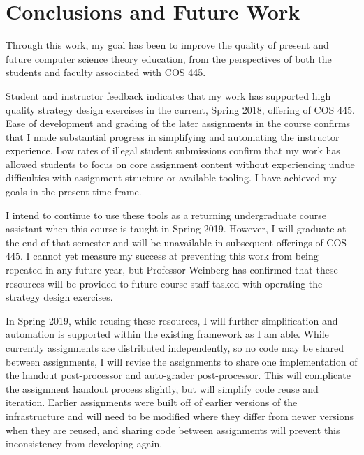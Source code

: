 \documentclass[pageno]{jpaper}
\begin{document}
\section*{Conclusions and Future Work}
Through this work, my goal has been to improve the quality of present and future computer science theory education, from the perspectives of both the students and faculty associated with COS 445.

Student and instructor feedback indicates that my work has supported high quality strategy design exercises in the current, Spring 2018, offering of COS 445.
Ease of development and grading of the later assignments in the course confirms that I made substantial progress in simplifying and automating the instructor experience.
Low rates of illegal student submissions confirm that my work has allowed students to focus on core assignment content without experiencing undue difficulties with assignment structure or available tooling.
I have achieved my goals in the present time-frame.

I intend to continue to use these tools as a returning undergraduate course assistant when this course is taught in Spring 2019.
However, I will graduate at the end of that semester and will be unavailable in subsequent offerings of COS 445.
I cannot yet measure my success at preventing this work from being repeated in any future year, but Professor Weinberg has confirmed that these resources will be provided to future course staff tasked with operating the strategy design exercises.


In Spring 2019, while reusing these resources, I will further simplification and automation is supported within the existing framework as I am able.
While currently assignments are distributed independently, so no code may be shared between assignments, I will revise the assignments to share one implementation of the handout post-processor and auto-grader post-processor.
This will complicate the assignment handout process slightly, but will simplify code reuse and iteration.
Earlier assignments were built off of earlier versions of the infrastructure and will need to be modified where they differ from newer versions when they are reused, and sharing code between assignments will prevent this inconsistency from developing again.
\end{document}
